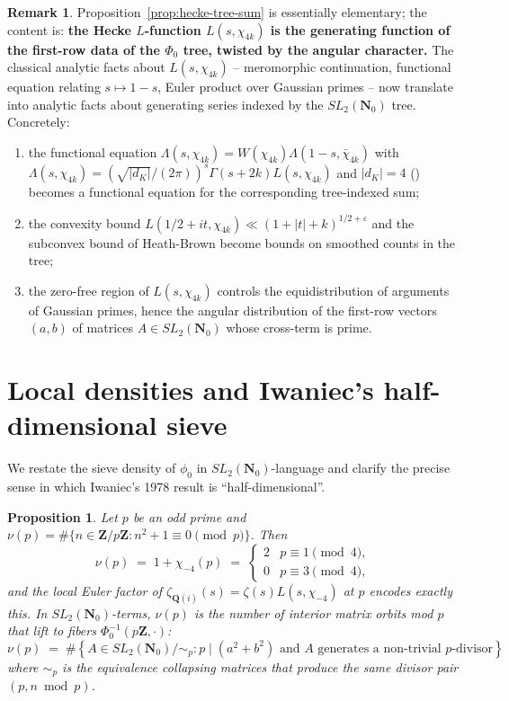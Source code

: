 \documentclass[11pt]{article}
\newtheorem{proposition}[theorem]{Proposition}
\theoremstyle{definition}
\newtheorem{remark}[theorem]{Remark}
\newcommand{\Nz}{\mathbf{N}_0}
\newcommand{\Z}{\mathbf{Z}}
\newcommand{\Q}{\mathbf{Q}}
\newcommand{\SLNz}{SL_2(\Nz)}
\begin{document}
\begin{remark}\label{rmk:l-function-tree-meaning}
Proposition~\ref{prop:hecke-tree-sum} is essentially elementary; the content is:
\textbf{the Hecke $L$-function $L(s, \chi_{4k})$ is the generating function of the
first-row data of the $\Phi_0$ tree, twisted by the angular character.} The classical
analytic facts about $L(s,\chi_{4k})$ -- meromorphic continuation, functional equation
relating $s\mapsto 1-s$, Euler product over Gaussian primes -- now translate into
analytic facts about generating series indexed by the $\SLNz$ tree. Concretely:
\begin{enumerate}
  \item the functional equation
    $\Lambda(s,\chi_{4k}) = W(\chi_{4k})\Lambda(1-s,\bar\chi_{4k})$
    with $\Lambda(s,\chi_{4k}) = (\sqrt{|d_K|}/(2\pi))^s \Gamma(s + 2k) L(s,\chi_{4k})$ and
    $|d_K| = 4$ (\cite[\S 3.8]{IK}) becomes a functional equation for the corresponding
    tree-indexed sum;
  \item the convexity bound $L(1/2 + it, \chi_{4k}) \ll (1+|t|+k)^{1/2+\varepsilon}$ and the
    subconvex bound of Heath-Brown \cite{HB80} become bounds on smoothed counts in the tree;
  \item the zero-free region of $L(s, \chi_{4k})$ controls the equidistribution of arguments
    of Gaussian primes, hence the angular distribution of the first-row vectors $(a,b)$ of
    matrices $A \in \SLNz$ whose cross-term is prime.
\end{enumerate}
\end{remark}

\section{Local densities and Iwaniec's half-dimensional sieve}\label{sec:iwaniec}

We restate the sieve density of $\phi_0$ in $\SLNz$-language and clarify the precise sense
in which Iwaniec's 1978 result \cite{iwaniec1978} is ``half-dimensional''.

\begin{proposition}\label{prop:local-density-tree}
Let $p$ be an odd prime and $\nu(p) = \#\{n \in \Z/p\Z : n^2 + 1 \equiv 0\pmod p\}$. Then
\[
   \nu(p) \;=\; 1 + \chi_{-4}(p) \;=\; \begin{cases} 2 & p \equiv 1\pmod 4,\\ 0 & p\equiv 3\pmod 4,\end{cases}
\]
and the local Euler factor of $\zeta_{\Q(i)}(s) = \zeta(s) L(s,\chi_{-4})$ at $p$ encodes
exactly this. In $\SLNz$-terms, $\nu(p)$ is the number of \emph{interior matrix orbits}
mod $p$ that lift to fibers $\Phi_0^{-1}(p\Z, \cdot)$:
\[
  \nu(p) \;=\; \#\left\{ A \in \SLNz/\!\sim_p : p \mid (a^2+b^2) \text{ and } A \text{ generates a non-trivial } p\text{-divisor} \right\}
\]
where $\sim_p$ is the equivalence collapsing matrices that produce the same divisor pair
$(p, n \bmod p)$.
\end{proposition}
\end{document}
